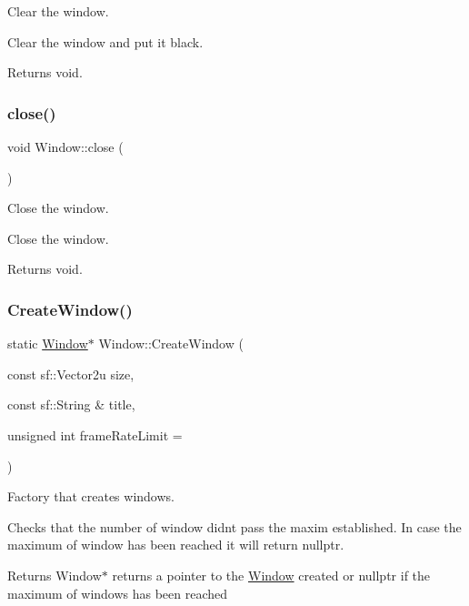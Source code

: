 Clear the window. 

Clear the window and put it black.

\begin{DoxyReturn}{Returns}
void. 
\end{DoxyReturn}
\mbox{\label{class_window_a35055c04498121d39741bfcd5082705b}} 
\subsubsection{\texorpdfstring{close()}{close()}}
{\footnotesize\ttfamily void Window\+::close (\begin{DoxyParamCaption}{ }\end{DoxyParamCaption})}



Close the window. 

Close the window.

\begin{DoxyReturn}{Returns}
void. 
\end{DoxyReturn}
\mbox{\label{class_window_ac23ace79f02693ff5463f91dba8bb38b}} 
\subsubsection{\texorpdfstring{Create\+Window()}{CreateWindow()}}
{\footnotesize\ttfamily static \hyperlink{class_window}{Window}$\ast$ Window\+::\+Create\+Window (\begin{DoxyParamCaption}\item[{const sf\+::\+Vector2u}]{size,  }\item[{const sf\+::\+String \&}]{title,  }\item[{unsigned int}]{frame\+Rate\+Limit = {} }\end{DoxyParamCaption})\hspace{0.3cm}{\ttfamily [static]}}



Factory that creates windows. 

Checks that the number of window didn\textquotesingle{}t pass the maxim established. In case the maximum of window has been reached it will return nullptr.

\begin{DoxyReturn}{Returns}
Window$\ast$ returns a pointer to the \hyperlink{class_window}{Window} created or nullptr if the maximum of windows has been reached 
\end{DoxyReturn}
\mbox{\label{class_window_afadfafa5a0b9472554759004aafb327e}} 
